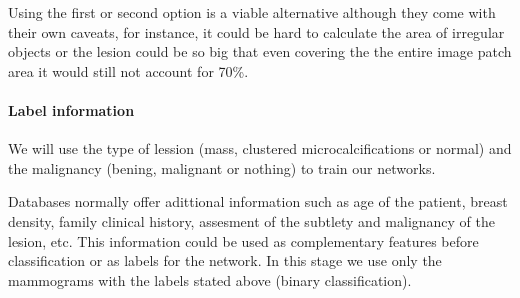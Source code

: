 Using the first or second option is a viable alternative although they come with their own caveats, for instance, it could be hard to calculate the area of irregular objects or the lesion could be so big that even covering the the entire image patch area it would still not account for 70\%.

\paragraph{Label information}
We will use the type of lession (mass, clustered microcalcifications or normal) and the malignancy (bening, malignant or nothing) to train our networks. 

Databases normally offer adittional information such as age of the patient, breast density, family clinical history, assesment of the subtlety and malignancy of the lesion, etc. This information could be used as complementary features before classification or as labels for the network. In this stage we use only the mammograms with the labels stated above (binary classification).

